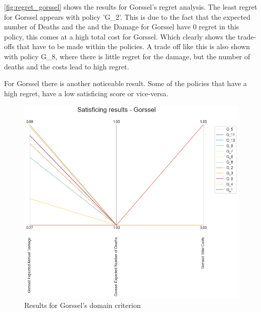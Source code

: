 \noindent \autoref{fig:regret_gorssel} shows the results for Gorssel's regret analysis. The least regret for Gorssel appears with policy 'G\_2'. This is due to the fact that the expected number of Deaths and the and the Damage for Gorssel have 0 regret in this policy, this comes at a high total cost for Gorssel. Which clearly shows the trade-offs that have to be made within the policies. A trade off like this is also shown with policy G\_8, where there is little regret for the damage, but the number of deaths and the costs lead to high regret.

For Gorssel there is another noticeable result. Some of the policies that have a high regret, have a low satisficing score or vice-versa.

\begin{figure}[H]
  \centering
  \begin{minipage}[b]{0.4\textwidth}
    \includegraphics[width=1.15\textwidth]{report/figures/results/domain_criterion_Gorssel.png}
    \caption{Results for Gorssel's domain criterion}
    \label{fig:domain_criterion_gorssel}
  \end{minipage}
  \hfill
  \begin{minipage}[b]{0.4\textwidth}

\end{minipage}
\end{figure}
